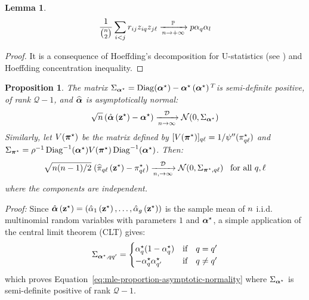 \documentclass[]{imsart}
\newcommand{\1}{\mathds{1}}
\numberwithin{equation}{section}
\theoremstyle{plain}
\newtheorem{proposition}[thm]{Proposition}
\newtheorem{lemme}[thm]{Lemma}
\theoremstyle{remark}
\begin{document}
\begin{lemme}
$$\frac{1}{\binom{n}{2}}\sum_{i < j} r_{ij} z_{i q} z_{j\ell} \xrightarrow[n \to +\infty]{\mathbb{P}} p \alpha_{q}\alpha_{l}$$
\label{lem:convdenom}
\end{lemme}
\begin{proof}
It is a consequence of Hoeffding's decomposition for U-statistics (see \cite{Hoeffding1948}) and Hoeffding concentration inequality.
\end{proof}



\begin{proposition}
  \label{prop:mle-asymptotic-normality}
  The matrix $\Sigma_{\boldsymbol{\alpha}^\star} = \operatorname{Diag}(\boldsymbol{\alpha}^\star) - \boldsymbol{\alpha}^\star\left(\boldsymbol{\alpha}^\star\right){^{T}} $is semi-definite positive, of rank $\mathcal{Q}-1$, and $\widehat{\boldsymbol{\alpha}}$ is asymptotically normal:
  \begin{equation}
    \label{eq:mle-proportion-asymptotic-normality}
    \sqrt{\n}\left( \hat{\bpi}\left(\bzs\right) - \bpis \right) \xrightarrow[\n \to \infty]{\mathcal{D}} \mathcal{N}(0, \Sigma_{\bpis})
  \end{equation}
Similarly, let $V(\boldsymbol{\pi}^\star)$ be the matrix defined by $[V(\boldsymbol{\pi}^\star)]_{q \ell} = 1/\psi''(\pi^\star_{q\ell})$ and\\  $\Sigma_{\boldsymbol{\pi}^\star} = \rho^{-1}\operatorname{Diag}^{-1}(\boldsymbol{\alpha}^\star) V(\boldsymbol{\pi}^\star) \operatorname{Diag}^{-1}(\boldsymbol{\alpha}^\star)$. Then:
  \begin{equation}
    \label{eq:mle-parameters-asymptotic-normality}
    \sqrt{\n(\n-1)/2}\;(\hal_{q\el}\left(\bzs\right) - \pi^\vrai_{q\el}) \xrightarrow[\n, \to \infty]{\mathcal{D}}  \mathcal{N}(0, \Sigma_{\bals, q \el})\;\;\; \hbox{for all  } q, \el
  \end{equation}
  where the components are independent. 
\end{proposition}

\textit{Proof:}
Since $\hat{\boldsymbol{\alpha}}\left(\mathbf{z}^\star\right) = \left(\hat{\alpha}_1\left(\mathbf{z}^\star\right), \dots, \hat{\alpha}_g\left(\mathbf{z}^\star\right)\right)$ is the sample mean of $n$ i.i.d. multinomial random variables with parameters $1$ and $\boldsymbol{\alpha}^\star$, a simple application of the central limit theorem (CLT) gives:
\begin{equation*}
  \Sigma_{\bpis, \kk \kp} =
  \begin{cases}
    \pii^{\vrai}_{\kk}(1 - \pii^{\vrai}_{\kk}) & \text{if} \quad \kk = \kp \\
    -\pii^{\vrai}_{\kk} \pii^{\vrai}_{\kp} & \text{if} \quad \kk \neq \kp \\
  \end{cases}
\end{equation*}
which proves Equation~\eqref{eq:mle-proportion-asymptotic-normality}
where $\Sigma_{\boldsymbol{\alpha}^\star}$ is
semi-definite positive of rank $\mathcal{Q} - 1$.
\end{document}
